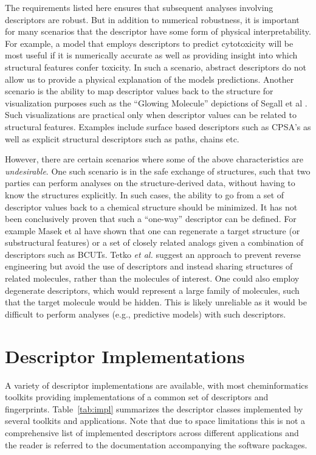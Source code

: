 \documentclass[letterpaper, 12pt]{article}
\begin{document}
The requirements listed here ensures that subsequent analyses
involving descriptors are robust. But in addition to numerical
robustness, it is important for many scenarios that the descriptor
have some form of physical interpretability.  For example, a model
that employs descriptors to predict cytotoxicity will be most useful if
it is numerically accurate as well as providing insight into which
structural features confer toxicity. In such a scenario, abstract
descriptors do not allow us to provide a physical explanation of the
models predictions. Another scenario is the ability to map descriptor
values back to the structure for visualization purposes such as the
``Glowing Molecule'' depictions of Segall et al
\cite{Segall:2009fk}. Such visualizations are practical only when
descriptor values can be related to structural features. Examples
include surface based descriptors such as CPSA's as well as explicit
structural descriptors such as paths, chains etc.

However, there are certain scenarios where some of the above
characteristics are \emph{undesirable}. One such scenario is in the
safe exchange of structures, such that two parties can perform
analyses on the structure-derived data, without having to know the
structures explicitly. In such cases, the ability to go from a set of
descriptor values back to a chemical structure should be minimized. It
has not been conclusively proven that such a ``one-way'' descriptor
can be defined. For example Masek et al \cite{Masek:2008aa} have shown
that one can regenerate a target structure (or substructural features)
or a set of closely related analogs given a combination of descriptors
such as BCUTs. Tetko \textit{et al.} \cite{Tetko:2005fk} suggest an approach to
prevent reverse engineering but avoid the use of descriptors and
instead sharing structures of related molecules, rather than the
molecules of interest. One could also employ degenerate descriptors,
which would represent a large family of molecules, such that the
target molecule would be hidden. This is likely unreliable as it would
be difficult to perform analyses (e.g., predictive models) with such
descriptors.

\section{Descriptor Implementations}
\label{sec:descr-impl}

A variety of descriptor implementations are available, with most
cheminformatics toolkits providing implementations of a common set of
descriptors and fingerprints. Table~\ref{tab:impl} summarizes the
descriptor classes implemented by several toolkits and
applications. Note that due to space limitations this is not a
comprehensive list of implemented descriptors across different
applications and the reader is referred to the documentation
accompanying the software packages.
\end{document}
